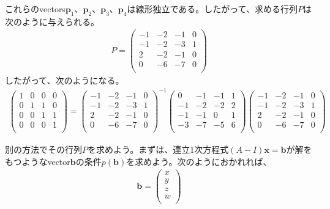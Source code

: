 \documentclass[dvipdfmx]{jsarticle}
\begin{document}
これらのvectors$\mathbf{p}_{1}$、$\mathbf{p}_{2}$、$\mathbf{p}_{3}$、$\mathbf{p}_{4}$は線形独立である。したがって、求める行列$P$は次のように与えられる。
\begin{align*}
P = \begin{pmatrix}
 - 1 & - 2 & - 1 & 0 \\
 - 1 & - 2 & - 3 & 1 \\
2 & - 2 & - 1 & 0 \\
0 & - 6 & - 7 & 0 \\
\end{pmatrix}
\end{align*}
したがって、次のようになる。
\begin{align*}
\begin{pmatrix}
1 & 0 & 0 & 0 \\
0 & 1 & 1 & 0 \\
0 & 0 & 1 & 1 \\
0 & 0 & 0 & 1 \\
\end{pmatrix} = \begin{pmatrix}
 - 1 & - 2 & - 1 & 0 \\
 - 1 & - 2 & - 3 & 1 \\
2 & - 2 & - 1 & 0 \\
0 & - 6 & - 7 & 0 \\
\end{pmatrix}^{- 1}\begin{pmatrix}
0 & - 1 & - 1 & 1 \\
 - 1 & - 2 & - 2 & 2 \\
 - 1 & - 1 & 0 & 1 \\
 - 3 & - 7 & - 5 & 6 \\
\end{pmatrix}\begin{pmatrix}
 - 1 & - 2 & - 1 & 0 \\
 - 1 & - 2 & - 3 & 1 \\
2 & - 2 & - 1 & 0 \\
0 & - 6 & - 7 & 0 \\
\end{pmatrix}
\end{align*}\par
別の方法でその行列$P$を求めよう。まずは、連立1次方程式$(A - I)\mathbf{x} = \mathbf{b}$が解をもつようなvector$\mathbf{b}$の条件$p(\mathbf{b})$を求めよう。次のようにおかれれば、
\begin{align*}
\mathbf{b} = \begin{pmatrix}
x \\
y \\
z \\
w \\
\end{pmatrix}
\end{align*}
\end{document}
